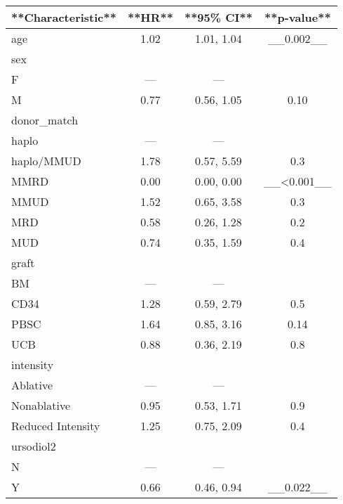 \documentclass[
]{book}
\begin{document}
\begin{tabular}{l|c|c|c}
\hline
**Characteristic** & **HR** & **95\% CI** & **p-value**\\
\hline
age & 1.02 & 1.01, 1.04 & \_\_0.002\_\_\\
\hline
sex &  &  & \\
\hline
F & — & — & \\
\hline
M & 0.77 & 0.56, 1.05 & 0.10\\
\hline
donor\_match &  &  & \\
\hline
haplo & — & — & \\
\hline
haplo/MMUD & 1.78 & 0.57, 5.59 & 0.3\\
\hline
MMRD & 0.00 & 0.00, 0.00 & \_\_<0.001\_\_\\
\hline
MMUD & 1.52 & 0.65, 3.58 & 0.3\\
\hline
MRD & 0.58 & 0.26, 1.28 & 0.2\\
\hline
MUD & 0.74 & 0.35, 1.59 & 0.4\\
\hline
graft &  &  & \\
\hline
BM & — & — & \\
\hline
CD34 & 1.28 & 0.59, 2.79 & 0.5\\
\hline
PBSC & 1.64 & 0.85, 3.16 & 0.14\\
\hline
UCB & 0.88 & 0.36, 2.19 & 0.8\\
\hline
intensity &  &  & \\
\hline
Ablative & — & — & \\
\hline
Nonablative & 0.95 & 0.53, 1.71 & 0.9\\
\hline
Reduced Intensity & 1.25 & 0.75, 2.09 & 0.4\\
\hline
ursodiol2 &  &  & \\
\hline
N & — & — & \\
\hline
Y & 0.66 & 0.46, 0.94 & \_\_0.022\_\_\\
\hline
\end{tabular}

  
\end{document}
